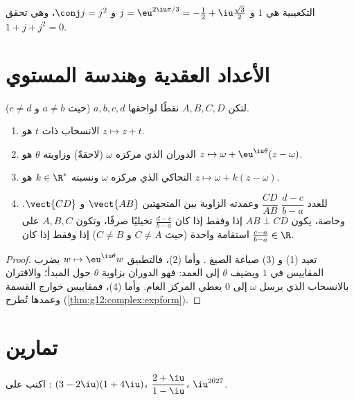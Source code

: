 \begin{example}
 التكعيبية هي $1$ و $j = \eu^{2\iu\pi/3} =
-\frac12 + \iu\frac{\sqrt3}{2}$ و $\conj j = j^2$، وهي تحقق
$1 + j + j^2 = 0$.
\end{example}

\section{الأعداد العقدية وهندسة المستوي}

\begin{proposition}\label{prop:g12:complex:geometry}
لتكن $A, B, C, D$ نقطًا لواحقها $a, b, c, d$ (حيث $a \neq b$
و $c \neq d$).
\begin{enumerate}
  \item الانسحاب  ذات  $t$ هو $z \mapsto z + t$.
  \item الدوران الذي مركزه $\omega$ (لاحقةً) وزاويته $\theta$ هو
        $z \mapsto \omega + \eu^{\iu\theta}(z - \omega)$.
  \item التحاكي الذي مركزه $\omega$ ونسبته
        $k \in \R^*$ هو $z \mapsto \omega + k(z - \omega)$.
  \item للعدد $\dfrac{d - c}{b - a}$  $\dfrac{CD}{AB}$ وعمدته
        الزاوية بين المتجهتين $\vect{AB}$ و $\vect{CD}$. وخاصة،
        يكون $AB \perp CD$ إذا وفقط إذا كان $\frac{d-c}{b-a}$ تخيليًا
        صرفًا، وتكون $A, B, C$ على استقامة واحدة (حيث $C \ne A$ و $C\ne B$) إذا
        وفقط إذا كان $\frac{c-a}{b-a} \in \R$.
\end{enumerate}
\end{proposition}

\begin{proof}
تعيد (1) و (3) صياغة الصيغ . وأما (2)، فالتطبيق
$w \mapsto \eu^{\iu\theta} w$ يضرب المقاييس في $1$ ويضيف $\theta$ إلى
العمد: فهو الدوران بزاوية $\theta$ حول المبدأ؛ والاقتران
بالانسحاب الذي يرسل $\omega$ إلى $0$ يعطي المركز العام. وأما
(4)، فمقاييس خوارج القسمة وعمدها تُطرح
(\cref{thm:g12:complex:expform}).
\end{proof}

\section{تمارين}

\begin{exercise}[$\star$]\label{exo:g12:complex:1}
اكتب على :
$(3 - 2\iu)(1 + 4\iu)$، \quad $\dfrac{2 + \iu}{1 - \iu}$، \quad
$\iu^{2027}$.
\end{exercise}

